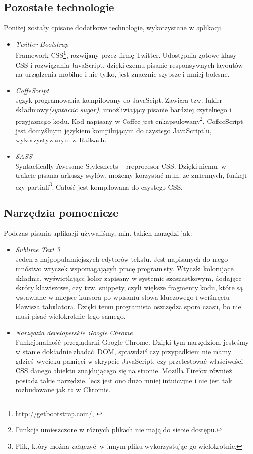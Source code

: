   \subsection{Pozostałe technologie}
    \label{other_technology}
    Poniżej zostały opisane dodatkowe technologie, wykorzystane w aplikacji.
    \begin{itemize}
      \item \emph{Twitter Bootstrap} \\ 
      Framework CSS\footnote{\url{http://getbootstrap.com/}, \cite{bootstrap}}, rozwijany przez firmę Twitter. Udostępnia gotowe klasy CSS i rozwiązania JavaScript, dzięki czemu pisanie responsywnych layoutów na urządzenia mobilne i nie tylko, jest znacznie szybsze i mniej bolesne.
      \item \emph{CoffeScript} \\ 
      Język programowania kompilowany do JavaScipt\cite{coffee}. Zawiera tzw. lukier składniowy\emph{(syntactic sugar)}, umożliwiający pisanie bardziej czytelnego i przyjaznego kodu. Kod napisany w Coffee jest enkapsulowany\footnote{Funkcje umieszczone w różnych plikach nie mają do siebie dostępu.}. CoffeeScript jest domyślnym językiem kompilującym do czystego JavaScript'u, wykorzystywanym w Railsach.
      \item \emph{SASS} \\ 
      Syntactically Awesome Stylesheets\cite{sass} - preprocesor CSS. Dzięki niemu, w~ trakcie pisania arkuszy stylów, możemy korzystać m.in. ze zmiennych, funkcji czy partiali\footnote{Plik, który można załączyć w innym pliku wykorzystując go wielokrotnie.}. Całość jest kompilowana do czystego CSS.
    \end{itemize}
  \subsection{Narzędzia pomocnicze}
    Podczas pisania aplikacji używaliśmy, min. takich narzędzi jak:
    \begin{itemize}
      \item \emph{Sublime Text 3} \\ 
      Jeden z najpopularniejszych edytorów tekstu. Jest napisanych do niego mnóstwo wtyczek wspomagającyh pracę programisty. Wtyczki kolorujące składnie, wyświetlające kolor zapisany w systemie szesnastkowym, dodające skróty klawiszowe, czy tzw. snippety, czyli większe fragmenty kodu, które są wstawiane w miejsce kursora po wpisaniu słowa kluczowego i wciśnięciu klawisza tabulatora. Dzięki temu programista oszczędza sporo czasu, bo nie musi pisać wielokrotnie tego samego.
      \item \emph{Narzędzia developerskie Google Chrome} \\ 
      Funkcjonalność przeglądarki Google Chrome. Dzięki tym narzędziom jesteśmy w stanie dokładnie zbadać DOM, sprawdzić czy przypadkiem nie mamy gdzieś wycieku pamięci w skrypcie JavaScript, czy przetestować właściwości CSS danego obiektu znajdującego się na stronie. Mozilla Firefox również posiada takie narzędzie, lecz jest ono dużo mniej intuicyjne i nie jest tak rozbudowane jak to w Chromie.
    \end{itemize}

